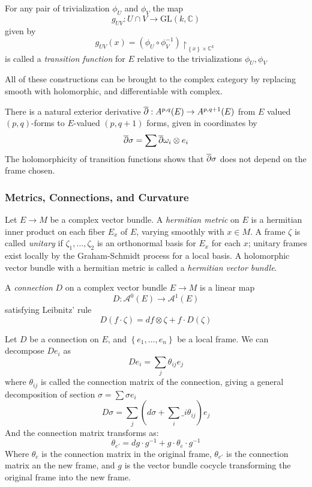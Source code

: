 \begin{defn}
	For any pair of trivialization $ \phi_U$ and $ \phi_V$ the map
	\[
		g_{UV}: U \cap V \to \mathrm{GL}(k, \mathbb{C})
	\]
	given by 
	\[
		g_{UV}(x) = \left( \phi_U \circ \phi_V^{-1} \right) \restriction_{ \left\{ x \right\} \times \mathbb{C}^k }
	\]
	is called a \textit{transition function} for $E$ relative to the trivializations $ \phi_U, \phi_V$
\end{defn}

All of these constructions can be brought to the complex category by replacing smooth with holomorphic, and differentiable with complex.

\begin{prop}
	There is a natural exterior derivative $ \overline{\partial}: A^{p,q}(E) \to A^{p,q+1}(E)$ from $E$ valued $(p,q)$-forms to $E$-valued $(p, q+1)$ forms, given in coordinates by 
	\[
	\overline{\partial} \sigma = \sum \overline{\partial}\omega_i \otimes e_i
	\]
	The holomorphicity of transition functions shows that $ \overline{\partial}\sigma$ does not depend on the frame chosen.	
\end{prop}

\subsubsection{Metrics, Connections, and Curvature}
\begin{defn}


Let $ E \to M$ be a complex vector bundle. A \textit{hermitian metric} on $E$ is a hermitian inner product on each fiber $E_x$ of $E$, varying smoothly with $ x \in M$. A frame $\zeta$ is called \textit{unitary} if $ \zeta_1, \ldots, \zeta_2$ is an orthonormal basis for $E_x$ for each $x$; unitary frames exist locally by the Graham-Schmidt process for a local basis. A holomorphic vector bundle with a hermitian metric is called a \textit{hermitian vector bundle}.

\end{defn}

\begin{defn}

A \textit{connection} $D$ on a complex vector bundle $E \to M$ is a linear map
\[
	D: \mathcal{A}^0 (E) \to \mathcal{A}^1(E)
\]
satisfying Leibnitz' rule
\[
	D(f \cdot \zeta) = df \otimes \zeta + f \cdot D( \zeta )
\]


\end{defn}

\begin{defn}

Let $D$ be a connection on $E$, and $ \left\{ e_1, \ldots, e_n \right\}$ be a local frame. We can decompose $D e_i$ as
\[
De_i = \sum_j \theta_{ ij } e_j
\]
where $ \theta_{ ij }$ is called the connection matrix of the connection, giving a general decomposition of section $ \sigma =\sum \sigma e_i$
\[
	D \sigma = \sum_j \left( d \sigma + \sum_i \_i \theta_{ ij } \right)e_j
\]
And the connection matrix transforms as:
\[
	\theta_{ e' } = dg \cdot g^{-1} + g \cdot \theta_e \cdot g^{-1}
\]
Where $\theta_e$ is the connection matrix in the original frame, $ \theta_{ e' }$ is the connection matrix an the new frame, and $g$ is the vector bundle cocycle transforming the original frame into the new frame.
\end{defn}


